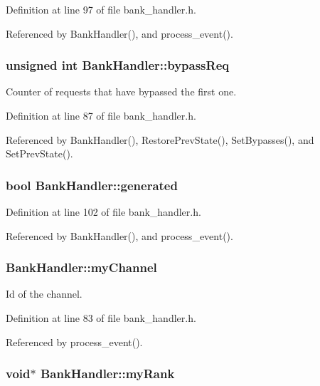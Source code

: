 Definition at line 97 of file bank\_\-handler.h.

Referenced by BankHandler(), and process\_\-event().
\subsubsection[{bypassReq}]{\setlength{\rightskip}{0pt plus 5cm}unsigned int {\bf BankHandler::bypassReq}}\label{classBankHandler_b30d5bf7f4e99ad9445a9bb046f26a0c}


Counter of requests that have bypassed the first one. 



Definition at line 87 of file bank\_\-handler.h.

Referenced by BankHandler(), RestorePrevState(), SetBypasses(), and SetPrevState().
\subsubsection[{generated}]{\setlength{\rightskip}{0pt plus 5cm}bool {\bf BankHandler::generated}\hspace{0.3cm}{\tt  [private]}}\label{classBankHandler_9c9d3b2903e25e71b17c3273f05e0f48}




Definition at line 102 of file bank\_\-handler.h.

Referenced by BankHandler(), and process\_\-event().
\subsubsection[{myChannel}]{ {\bf BankHandler::myChannel}}\label{classBankHandler_71b1e66fc232b80db751d53caee7d7ad}


Id of the channel. 



Definition at line 83 of file bank\_\-handler.h.

Referenced by process\_\-event().
\subsubsection[{myRank}]{\setlength{\rightskip}{0pt plus 5cm}void$\ast$ {\bf BankHandler::myRank}}\label{classBankHandler_d0ca9e41d498ef89fe2470aae4d87e6f}


